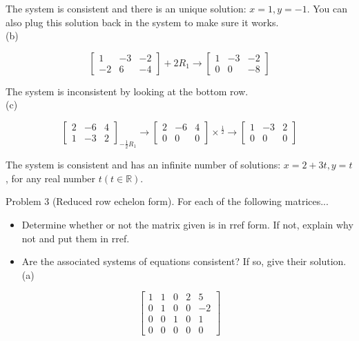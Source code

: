 \documentclass[10pt]{article}
\begin{document}
The system is consistent and there is an unique solution: $x=1, y=-1$. You can also plug this solution back in the system to make sure it works.\\
(b)

$$
\left[\begin{array}{cc|c}
1 & -3 & -2 \\
-2 & 6 & -4
\end{array}\right]+2 R_{1} \rightarrow\left[\begin{array}{cc|c}
1 & -3 & -2 \\
0 & 0 & -8
\end{array}\right]
$$

The system is inconsistent by looking at the bottom row.\\
(c)

$$
\left[\begin{array}{cc|c}
2 & -6 & 4 \\
1 & -3 & 2
\end{array}\right]_{-\frac{1}{2} R_{1}} \rightarrow\left[\begin{array}{cc|c}
2 & -6 & 4 \\
0 & 0 & 0
\end{array}\right] \times \stackrel{\frac{1}{2}}{ } \rightarrow\left[\begin{array}{cc|c}
1 & -3 & 2 \\
0 & 0 & 0
\end{array}\right]
$$

The system is consistent and has an infinite number of solutions: $x=2+3 t, y=t$, for any real number $t(t \in \mathbb{R})$.

Problem 3 (Reduced row echelon form). For each of the following matrices...

\begin{itemize}
  \item Determine whether or not the matrix given is in rref form. If not, explain why not and put them in rref.
  \item Are the associated systems of equations consistent? If so, give their solution.\\
(a)
\end{itemize}

$$
\left[\begin{array}{cccc|c}
1 & 1 & 0 & 2 & 5 \\
0 & 1 & 0 & 0 & -2 \\
0 & 0 & 1 & 0 & 1 \\
0 & 0 & 0 & 0 & 0
\end{array}\right]
$$
\end{document}
